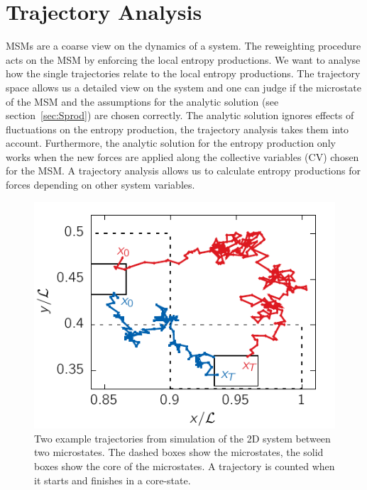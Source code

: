 \section{Trajectory Analysis}
\label{sec:Trajectory}
MSMs are a coarse view on the dynamics of a system. The reweighting procedure acts on the MSM by enforcing the local entropy productions. We want to analyse how the single trajectories relate to the local entropy productions. The trajectory space allows us a detailed view on the system and one can judge if the microstate of the MSM and the assumptions for the analytic solution (see section~\ref{sec:Sprod}) are chosen correctly. The analytic solution ignores effects of fluctuations on the entropy production, the trajectory analysis takes them into account. Furthermore, the analytic solution for the entropy production only works when the new forces are applied along the collective variables (CV) chosen for the MSM. A trajectory analysis allows us to calculate entropy productions for forces depending on other system variables.
\begin{figure}
\centering
 \includegraphics{../plots/Complementary/traj.pdf}
 \caption[Two example trajectories from simulation of the 2D system between two microstates.]{Two example trajectories from simulation of the 2D system between two microstates. The dashed boxes show the microstates, the solid boxes show the core of the microstates. A trajectory is counted when it starts and finishes in a core-state. }
 \label{fig:traj}
\end{figure}

